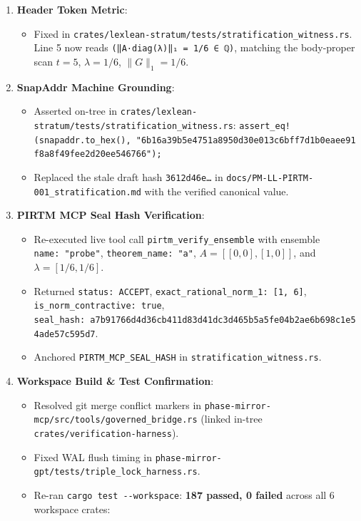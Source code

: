 \documentclass[
]{article}
\providecommand{\tightlist}{%
  \setlength{\itemsep}{0pt}\setlength{\parskip}{0pt}}
\begin{document}
\begin{enumerate}
\def\labelenumi{\arabic{enumi}.}
\tightlist
\item
  \textbf{Header Token Metric}:

  \begin{itemize}
  \tightlist
  \item
    Fixed in
    \texttt{crates/lexlean-stratum/tests/stratification\_witness.rs}.
    Line 5 now reads \texttt{(‖A·diag(λ)‖₁\ =\ 1/6\ ∈\ ℚ)}, matching the
    body-proper scan \(t = 5\), \(\lambda = 1/6\), \(\|G\|_1 = 1/6\).
  \end{itemize}
\item
  \textbf{SnapAddr Machine Grounding}:

  \begin{itemize}
  \tightlist
  \item
    Asserted on-tree in
    \texttt{crates/lexlean-stratum/tests/stratification\_witness.rs}:
    \texttt{assert\_eq!(snapaddr.to\_hex(),\ "6b16a39b5e4751a8950d30e013c6bff7d1b0eaee91f8a8f49fee2d20ee546766");}
  \item
    Replaced the stale draft hash \texttt{3612d46e…} in
    \texttt{docs/PM-LL-PIRTM-001\_stratification.md} with the verified
    canonical value.
  \end{itemize}
\item
  \textbf{PIRTM MCP Seal Hash Verification}:

  \begin{itemize}
  \tightlist
  \item
    Re-executed live tool call \texttt{pirtm\_verify\_ensemble} with
    ensemble \texttt{name:\ "probe"}, \texttt{theorem\_name:\ "a"},
    \(A = [[0,0],[1,0]]\), and \(\lambda = [1/6, 1/6]\).
  \item
    Returned \texttt{status:\ ACCEPT},
    \texttt{exact\_rational\_norm\_1:\ {[}1,\ 6{]}},
    \texttt{is\_norm\_contractive:\ true},
    \texttt{seal\_hash:\ a7b91766d4d36cb411d83d41dc3d465b5a5fe04b2ae6b698c1e54ade57c595d7}.
  \item
    Anchored \texttt{PIRTM\_MCP\_SEAL\_HASH} in
    \texttt{stratification\_witness.rs}.
  \end{itemize}
\item
  \textbf{Workspace Build \& Test Confirmation}:

  \begin{itemize}
  \tightlist
  \item
    Resolved git merge conflict markers in
    \texttt{phase-mirror-mcp/src/tools/governed\_bridge.rs} (linked
    in-tree \texttt{crates/verification-harness}).
  \item
    Fixed WAL flush timing in
    \texttt{phase-mirror-gpt/tests/triple\_lock\_harness.rs}.
  \item
    Re-ran \texttt{cargo\ test\ -\/-workspace}: \textbf{187 passed, 0
    failed} across all 6 workspace crates:


\end{itemize}
\end{enumerate}
\end{document}
